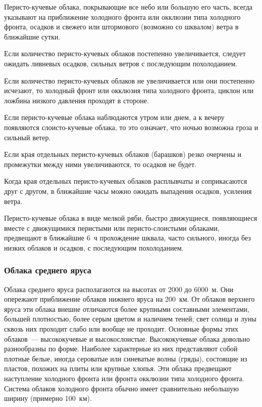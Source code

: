  Перисто-кучевые облака, покрывающие все небо или большую его
часть, всегда указывают на приближение холодного фронта или окклюзии
типа холодного фронта, осадков и свежего или штормового (возможно со
шквалом) ветра в ближайшие сутки.

 Если количество перисто-кучевых облаков постепенно
увеличивается, следует ожидать ливневых осадков, сильных ветров с
последующим похолоданием.

 Если количество перисто-кучевых облаков не увеличивается или
они постепенно исчезают, то холодный фронт или окклюзия типа холодного
фронта, циклон или ложбина низкого давления проходят в стороне.

 Если перисто-кучевые облака наблюдаются утром или днем, а к вечеру
появляются слоисто-кучевые облака, то это означает, что ночью возможна
гроза и сильный ветер.

 Если края отдельных перисто-кучевых облаков (барашков) резко
очерчены и промежутки между ними увеличиваются, то осадков не будет.

 Когда края отдельных перисто-кучевых облаков расплывчаты и
соприкасаются друг с другом, в ближайшие часы можно ожидать выпадения
осадков, усиления ветра.

 Перисто-кучевые облака в виде мелкой ряби, быстро движущиеся,
появляющиеся вместе с движущимися перистыми или перисто-слоистыми
облаками, предвещают в ближайшие 6~ч прохождение шквала, часто
сильного, иногда без низких облаков и осадков, с последующим
похолоданием.

\subsubsection{Облака среднего яруса}

Облака среднего яруса располагаются на высотах от 2000 до 6000~м. Они
опережают приближение облаков нижнего яруса на 200~км. От облаков
верхнего яруса эти облака внешне отличаются более крупными составными
элементами, большей плотностью, более серым цветом и наличием теней;
свет солнца и луны сквозь них проходит слабо или вообще не
проходит. Основные формы этих облаков~--- высококучевые и
высокослоистые. Высококучевые облака довольно разнообразны по
форме. Наиболее характерные из них представляют собой плотные белые,
иногда сероватые или синеватые волны (гряды), состоящие из пластов,
похожих на плиты или крупные хлопья. Эти облака предвещают наступление
холодного фронта или фронта окклюзии типа холодного фронта. Система
облаков холодного фронта обычно имеет сравнительно небольшую ширину
(примерно 100~км).

